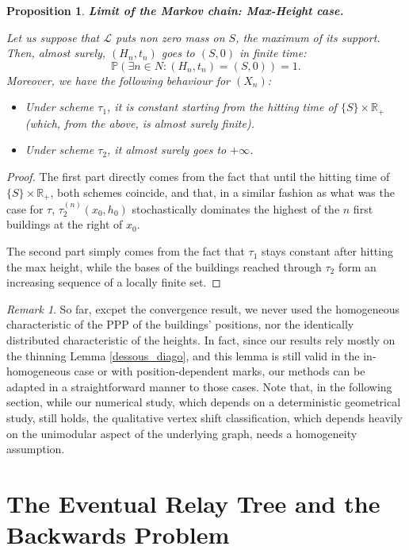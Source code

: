 \documentclass[10pt,english,a4paper]{smfart}
\newtheorem{proposition}{Proposition}[section]
\theoremstyle{definition}
\theoremstyle{remark}
\newtheorem{remark}{Remark}
\newcommand{\R}{\mathbb{R}}
\newcommand{\p}{\mathbb{P}}
\begin{document}
\begin{proposition}\textbf{Limit of the Markov chain: Max-Height case.}

Let us suppose that $\mathcal{L}$ puts non zero mass on $S$, the maximum of its support. Then, almost surely, $(H_n, t_n)$ goes to $(S, 0)$ in finite time:
\[\p\left(\exists n \in N : (H_n, t_n) = (S, 0)\right) = 1.\]
Moreover, we have the following behaviour for $(X_n)$:
\begin{itemize}
    \item Under scheme $\tau_1$, it is constant starting from the hitting time of $\{S\}\times \R_+$ (which, from the above, is almost surely finite).
    \item Under scheme $\tau_2$, it almost surely goes to $+\infty$.
\end{itemize}

\end{proposition}

\begin{proof}
The first part directly comes from the fact that until the hitting time of $\{S\}\times \R_+$, both schemes coincide, and that, in a similar fashion as what was the case for $\tau$, $\tau_2^{(n)}(x_0, h_0)$ stochastically dominates the highest of the $n$ first buildings at the right of $x_0$.

The second part simply comes from the fact that $\tau_1$ stays constant after hitting the max height, while the bases of the buildings reached through $\tau_2$ form an increasing sequence of a locally finite set.
\end{proof}

\begin{remark}
So far, excpet the convergence result, we never used the homogeneous characteristic of the PPP of the buildings' positions, nor the identically distributed characteristic of the heights. In fact, since our results rely mostly on the thinning Lemma \ref{dessous_diago}, and this lemma is still valid in the in-homogeneous case or with position-dependent marks, our methods can be adapted in a straightforward manner to those cases. Note that, in the following section, while our numerical study, which depends on a deterministic geometrical study, still holds, the qualitative vertex shift classification, which depends heavily on the unimodular aspect of the underlying graph, needs a homogeneity assumption.
\end{remark}


\section{The Eventual Relay Tree and the Backwards Problem}\label{tree}
\end{document}
